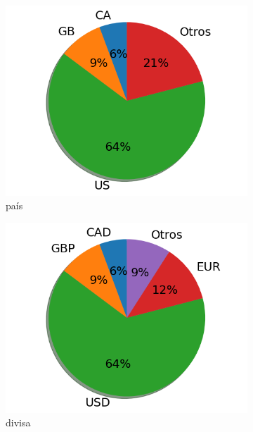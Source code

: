 \begin{figure}[!ht]
	\centering
	\small
	\begin{subfigure}{.35\textwidth}
		\centering
		\includegraphics[width=1.13\linewidth]{4/figures/country_distribution.png}
		\caption{país}
	\end{subfigure}%
	\begin{subfigure}{.36\textwidth}
		\centering
		\includegraphics[width=1.13\linewidth]{4/figures/currency_distribution.png}
		\caption{divisa}
	\end{subfigure}%
	\begin{subfigure}{.35\textwidth}
		\centering

\end{subfigure}
\end{figure}
